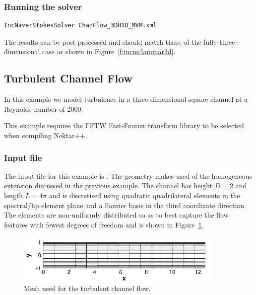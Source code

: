 \subsubsection{Running the solver}
\begin{lstlisting}[style=BashInputStyle]
IncNaverStokesSolver ChanFlow_3DH1D_MVM.xml
\end{lstlisting}
The results can be post-processed and should match those of the fully
three-dimensional case as shown in Figure~\ref{f:incns:laminar3d}.



\subsection{Turbulent Channel Flow}
In this example we model turbulence in a three-dimensional square channel at a
Reynolds number of 2000.

\begin{notebox}
This example requires the FFTW Fast-Fourier transform library to be selected
when compiling Nektar++.
\end{notebox}

\subsubsection{Input file}
The input file for this example is . The geometry
makes used of the homogeneous extension discussed in the previous example. The
channel has height $D=2$ and length $L=4\pi$ and is discretised using quadratic
quadrilateral elements in the spectral/hp element plane and a Fourier basis in
the third coordinate direction. The elements are non-uniformly distributed so as
to best capture the flow features with fewest degrees of freedom and is shown in
Figure~\ref{f:incns:turbchanmesh}.

\begin{figure}
\begin{center}
\includegraphics[width=10cm]{img/ChanMesh.png}
\caption{Mesh used for the turbulent channel flow.}
\label{f:incns:turbchanmesh}
\end{center}
\end{figure}

